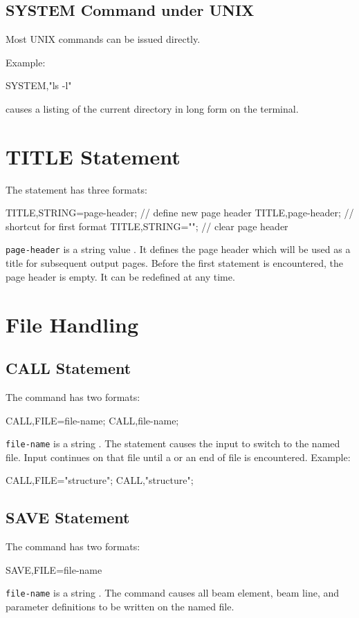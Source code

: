 \subsection{SYSTEM Command under UNIX}
Most UNIX commands can be issued directly.

\noindent Example:
\begin{example}
SYSTEM,"ls -l"
\end{example}
causes a listing of the current directory in long form on the terminal.

\section{TITLE Statement}
\label{sec:title}
The  statement has three formats:
\begin{example}
TITLE,STRING=page-header;   // define new page header
TITLE,page-header;          // shortcut for first format
TITLE,STRING="";            // clear page header
\end{example}
\texttt{page-header} is a string value .
It defines the page header which will be used as a title for
subsequent output pages.
Before the first  statement is encountered,
the page header is empty.
It can be redefined at any time.

\section{File Handling}

\subsection{CALL Statement}
\label{sec:call}
The  command has two formats:
\begin{example}
CALL,FILE=file-name;
CALL,file-name;
\end{example}
\texttt{file-name} is a string .
The statement causes the input to switch to the named file.
Input continues on that file until a  or an end of file
is encountered.
\noindent Example:
\begin{example}
CALL,FILE="structure";
CALL,"structure";
\end{example}

\subsection{SAVE Statement}
\label{sec:save}
The  command has two formats:
\begin{example}
SAVE,FILE=file-name
\end{example}
\texttt{file-name} is a string .
The command causes all beam element, beam line, and parameter definitions
to be written on the named file.

